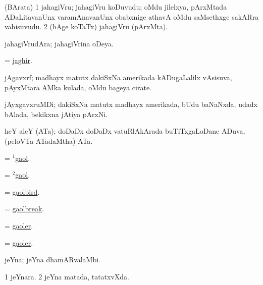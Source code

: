 \bentry
{}
\gl{\nA}
\bmng
(BArata) 
\bnum
\num{1} ja{ha}giVru; jahagiVru koDuvudu; oMdu jilelxya, pArxMtada ADaLitavanUnx varamAnavanUnx obabxnige athavA oMdu saMsethxge sakARra vahisuvudu. 
\num{2} (hAge koTaTx) jahagiVru (pArxMta). 
\enum
\emng
\eentry

\bentry
{}
\gl{\nA}
\bmng
ja{ha}giVrudAra; ja{ha}giVrina oDeya. 
\emng
\eentry

\bentry
{}
\gl{\nA}
\bmng
 = \hyperlink{jaghir}{jaghir}. 
\emng
\eentry

\bentry
{}
\gl{\nA}
\bmng
jAgavxrf; madhayx matutx dakiSxNa amerikada kADugaLalilx vAsisuva, pAyxMtara AMka kulada, oMdu bageya cirate.   
\emng
\eentry

\bentry
{}
\gl{\nA}
\bmng
jAyxgavxruMDi; dakiSxNa matutx madhayx amerikada, bUdu baNaNxda, udadx bAlada, bekikxna jAtiya pArxNi. 
\emng
\eentry

\bentry
{}
\gl{\nA}
\bmng
heY aleY (ATa); doDaDx doDaDx vatuRlAkArada buTiTxgaLoDane ADuva, (peloVTa ATadaMtha) ATa. 
\emng
\eentry

\bentry
{}
\gl{\nA}
\bmng
= \hyperref{kandict_g.pdf}{G}{gaol(1)}{$^1$gaol}. 
\emng
\eentry

\bentry
{}
\gl{\sakirx}
\bmng
= \hyperref{kandict_g.pdf}{G}{gaol(2)}{$^2$gaol}. 
\emng
\eentry

\bentry
{}
\gl{\nA}
\bmng
= \hyperref{kandict_g.pdf}{G}{gaolbird}{gaolbird}. 
\emng
\eentry

\bentry
{}
\gl{\nA}
\bmng
= \hyperref{kandict_g.pdf}{G}{gaolbreak}{gaolbreak}. 
\emng
\eentry

\bentry
{}
\gl{\nA}
\bmng
= \hyperref{kandict_g.pdf}{G}{gaoler}{gaoler}. 
\emng
\eentry

\bentry
{}
\gl{\nA}
\bmng
= \hyperref{kandict_g.pdf}{G}{gaoler}{gaoler}. 
\emng
\eentry

\bentry
{}
\gl{\nA}
\bmng
jeYna; jeYna dhamARvalaMbi. 
\emng
\eentry

\bentry
{}
\gl{\gu}
\bmng
\bnum
\num{1} jeYnara. 
\num{2} jeYna matada, tatatxvXda. 
\enum
\emng
\eentry

